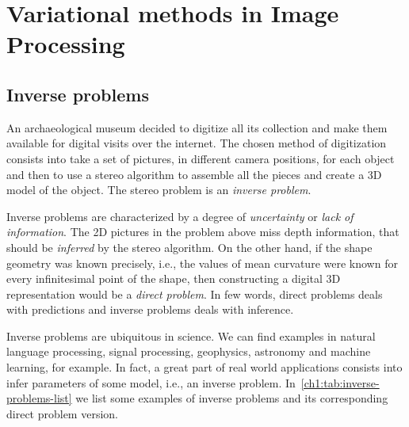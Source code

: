 \chapter{Variational methods in Image Processing}
\label{chapter:variational-methods-in-image-processing}

\section{Inverse problems}

An archaeological museum decided to digitize all its collection and make them available for digital visits over the internet. The chosen method of digitization consists into take a set of pictures, in different camera positions, for each object and then to use a stereo algorithm to assemble all the pieces and create a 3D model of the object. The stereo problem is an \emph{inverse problem}.

Inverse problems are characterized by a degree of \emph{uncertainty} or \emph{lack of information}. The 2D pictures in the problem above miss depth information, that should be \emph{inferred} by the stereo algorithm. On the other hand, if the shape geometry was known precisely, i.e., the values of mean curvature were known for every infinitesimal point of the shape, then constructing a digital 3D representation would be a \emph{direct problem}. In few words, direct problems deals with predictions and inverse problems deals with inference.

Inverse problems are ubiquitous in science. We can find examples in natural language processing, signal processing, geophysics, astronomy and machine learning, for example. In fact, a great part of real world applications consists into infer parameters of some model, i.e., an inverse problem. In~\cref{ch1:tab:inverse-problems-list} we list some examples of inverse problems and its corresponding direct problem version.

